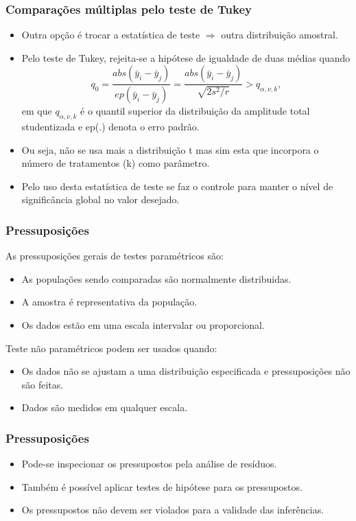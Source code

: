 \documentclass{beamer}
\begin{document}
\begin{frame}
\frametitle{Comparações múltiplas pelo teste de Tukey}

\begin{itemize}
\item Outra opção é trocar a estatística de teste \(\Rightarrow\) outra distribuição amostral.
\item Pelo teste de Tukey, rejeita-se a hipótese de igualdade de duas médias quando
\[q_0 = \frac{abs(\bar{y}_i-\bar{y}_j)}{ep(\bar{y}_i-\bar{y}_j)}=\frac{abs(\bar{y}_i-\bar{y}_j)}{\sqrt{2s^2/r}} > q_{\alpha, \nu, k},\]
em que \(q_{\alpha, \nu, k}\) é o quantil superior da distribuição da amplitude total studentizada e ep(.) denota o erro padrão.
\item Ou seja, não se usa mais a distribuição t mas sim esta que incorpora o número de tratamentos (k) como parâmetro.
\item Pelo uso desta estatística de teste se faz o controle para manter o nível de significância global no valor desejado. 
\end{itemize}

\end{frame}

\begin{frame}
\frametitle{Pressuposições}
As pressuposições gerais de testes paramétricos são:
\begin{itemize}
\item As populações sendo comparadas são normalmente distribuidas.
\item A amostra é representativa da população.
\item Os dados estão em uma escala intervalar ou proporcional.
\end{itemize}
Teste não paramétricos podem ser usados quando:
\begin{itemize}
\item Os dados não se ajustam a uma distribuição especificada e pressuposições não são feitas.
\item Dados são medidos em qualquer escala.
\end{itemize}


\end{frame}

\begin{frame}
\frametitle{Pressuposições}

\begin{itemize}
\item Pode-se inspecionar os pressupostos pela análise de resíduos.
\item Também é possível aplicar testes de hipótese para os pressupostos.
\item Os pressupostos não devem ser violados para a validade das inferências.
\end{itemize}

\end{frame}
\end{document}

